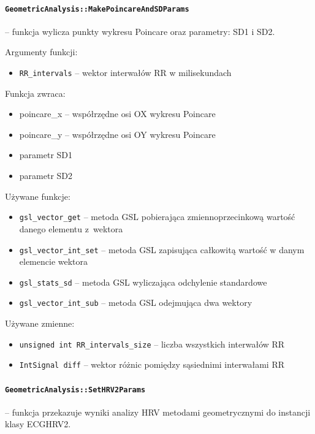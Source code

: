 \documentclass[a4paper, 11pt]{article}
\begin{document}
\paragraph{\texttt{GeometricAnalysis::MakePoincareAndSDParams}} -- funkcja wylicza punkty wykresu Poincare oraz parametry: SD1 i SD2.

\medskip{}


Argumenty funkcji:
\begin{itemize}
\item \verb+RR_intervals+ -- wektor interwałów RR w milisekundach
\end{itemize}
\medskip{}


Funkcja zwraca:
\begin{itemize}
\item poincare\_x -- współrzędne osi OX wykresu Poincare
\item poincare\_y -- współrzędne osi OY wykresu Poincare
\item parametr SD1
\item parametr SD2
\end{itemize}
\medskip{}


Używane funkcje:
\begin{itemize}
\item \verb+gsl_vector_get+ -- metoda GSL pobierająca zmiennoprzecinkową wartość
danego elementu z~wektora
\item \verb+gsl_vector_int_set+ -- metoda GSL zapisująca całkowitą wartość w
danym elemencie wektora
\item \verb+gsl_stats_sd+ -- metoda GSL wyliczająca odchylenie standardowe
\item \verb+gsl_vector_int_sub+ -- metoda GSL odejmująca dwa wektory
\end{itemize}
\medskip{}


Używane zmienne:
\begin{itemize}
\item \verb+unsigned int RR_intervals_size+ -- liczba wszystkich interwałów RR
\item \verb+IntSignal diff+ -- wektor różnic pomiędzy sąsiednimi interwałami RR
\end{itemize}
%

\paragraph{\texttt{GeometricAnalysis::SetHRV2Params}} -- funkcja przekazuje wyniki analizy HRV metodami geometrycznymi do instancji
klasy ECGHRV2.
\end{document}
